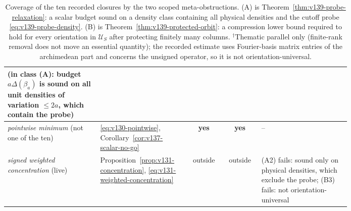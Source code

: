 \begin{table}[t]
\begin{tabular}{@{}p{0.27\linewidth}p{0.26\linewidth}cc p{0.26\linewidth}@{}}
(in class (A): budget $a\Delta(\beta_a)$ is sound on all unit densities of
variation $\le2a$, which contain the probe)\\
\midrule
\emph{pointwise minimum} (not one of the ten) &
\eqref{eq:v130-pointwise}, Corollary~\ref{cor:v137-scalar-no-go} &
\textbf{yes} & \textbf{yes} & --\\
\emph{signed weighted concentration} (live) &
Proposition~\ref{prop:v131-concentration},
\eqref{eq:v131-weighted-concentration} & outside & outside &
(A2) fails: sound only on physical densities, which exclude the probe;
(B3) fails: not orientation-universal\\
\bottomrule
\end{tabular}
\caption{Coverage of the ten recorded closures by the two scoped
meta-obstructions. (A) is Theorem~\ref{thm:v139-probe-relaxation}: a scalar
budget sound on a density class containing all physical densities and the
cutoff probe \eqref{eq:v139-probe-density}. (B) is
Theorem~\ref{thm:v139-protected-orbit}: a compression lower bound required
to hold for every orientation in $\mathcal U_S$ after protecting finitely
many columns. $^{\dagger}$Thematic parallel only (finite-rank removal does
not move an essential quantity); the recorded estimate uses Fourier-basis
matrix entries of the archimedean part and concerns the unsigned operator,
so it is not orientation-universal.}
\label{tab:ns4b-coverage}
\end{table}

